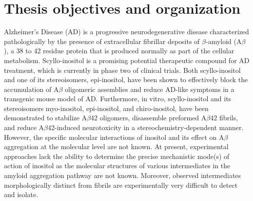 



\section{Thesis objectives and organization}
Alzheimer's Disease (AD) is a progressive neurodegenerative disease characterized pathologically by the presence of extracellular fibrillar deposits of $\beta$-amyloid (A$\beta$), a 38 to 42 residue protein that is produced normally as part of the cellular metabolism. Scyllo-inositol is a promising potential therapeutic compound for AD treatment, which is currently in phase two of clinical trials. Both scyllo-inositol and one of its stereoisomers, epi-inositol, have been shown to effectively block the accumulation of A$\beta$ oligomeric assemblies and reduce AD-like symptoms in a transgenic mouse model of AD. Furthermore, in vitro, scyllo-inositol and its stereoisomers myo-inositol, epi-inositol, and chiro-inositol, have been demonstrated to stabilize A$\beta$42 oligomers, disassemble preformed A$\beta$42 fibrils, and reduce A$\beta$42-induced neurotoxicity in a stereochemistry-dependent manner. However, the specific molecular interactions of inositol and its effect on A$\beta$ aggregation at the molecular level are not known. At present, experimental approaches lack the ability to determine the precise mechanistic mode(s) of action of inositol as the molecular structures of various intermediates in the amyloid aggregation pathway are not known. Moreover, observed intermediates morphologically distinct from fibrils are experimentally very difficult to detect and isolate.

